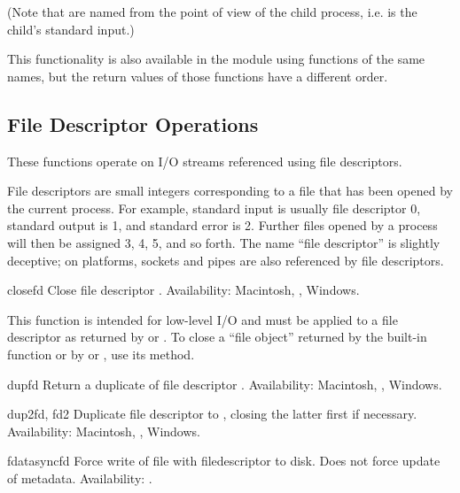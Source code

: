 (Note that  are named from the point of view of the child
process, i.e.  is the child's standard input.)

This functionality is also available in the  module
using functions of the same names, but the return values of those
functions have a different order.


\subsection{File Descriptor Operations \label{os-fd-ops}}

These functions operate on I/O streams referenced using file
descriptors.  

File descriptors are small integers corresponding to a file that has
been opened by the current process.  For example, standard input is
usually file descriptor 0, standard output is 1, and standard error is
2.  Further files opened by a process will then be assigned 3, 4, 5,
and so forth.  The name ``file descriptor'' is slightly deceptive; on
{\UNIX} platforms, sockets and pipes are also referenced by file descriptors.


\begin{funcdesc}{close}{fd}
Close file descriptor .
Availability: Macintosh, \UNIX, Windows.

\begin{notice}
This function is intended for low-level I/O and must be applied
to a file descriptor as returned by  or
.  To close a ``file object'' returned by the
built-in function  or by  or
, use its  method.
\end{notice}
\end{funcdesc}

\begin{funcdesc}{dup}{fd}
Return a duplicate of file descriptor .
Availability: Macintosh, \UNIX, Windows.
\end{funcdesc}

\begin{funcdesc}{dup2}{fd, fd2}
Duplicate file descriptor  to , closing the latter
first if necessary.
Availability: Macintosh, \UNIX, Windows.
\end{funcdesc}

\begin{funcdesc}{fdatasync}{fd}
Force write of file with filedescriptor  to disk.
Does not force update of metadata.
Availability: \UNIX.
\end{funcdesc}

